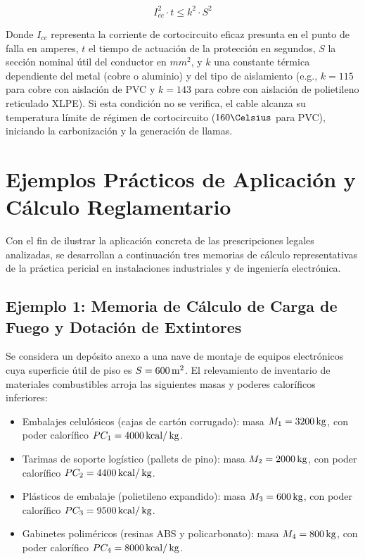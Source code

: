 \begin{equation}
\label{eq.cap4:tiempo_corte}
I_{cc}^2 \cdot t \le k^2 \cdot S^2
\end{equation}

Donde $I_{cc}$ representa la corriente de cortocircuito eficaz presunta en el punto de falla en amperes, $t$ el tiempo
de actuación de la protección en segundos, $S$ la sección nominal útil del conductor en $mm^2$, y $k$ una constante
térmica dependiente del metal (cobre o aluminio) y del tipo de aislamiento (e.g., $k = 115$ para cobre con aislación de
PVC y $k = 143$ para cobre con aislación de polietileno reticulado XLPE). Si esta condición no se verifica, el cable
alcanza su temperatura límite de régimen de cortocircuito ($160\Celsius$ para PVC), iniciando la carbonización y la
generación de llamas.

\section{Ejemplos Prácticos de Aplicación y Cálculo Reglamentario}
\label{sec.cap4:ejemplos_practicos}

Con el fin de ilustrar la aplicación concreta de las prescripciones legales analizadas, se desarrollan a continuación
tres memorias de cálculo representativas de la práctica pericial en instalaciones industriales y de ingeniería
electrónica.

\subsection{Ejemplo 1: Memoria de Cálculo de Carga de Fuego y Dotación de Extintores}
\label{sec.cap4:ejemplo_carga_fuego}

Se considera un depósito anexo a una nave de montaje de equipos electrónicos cuya superficie útil de piso es $S = 600\,\mathrm{m}^2$.
El relevamiento de inventario de materiales combustibles arroja las siguientes masas y poderes caloríficos inferiores:

\begin{itemize}
    \item Embalajes celulósicos (cajas de cartón corrugado): masa $M_1 = 3200\,\mathrm{kg}$, con poder calorífico
          $PC_1 = 4000\,\mathrm{kcal}/\,\mathrm{kg}$.
    \item Tarimas de soporte logístico (pallets de pino): masa $M_2 = 2000\,\mathrm{kg}$, con poder calorífico
          $PC_2 = 4400\,\mathrm{kcal}/\,\mathrm{kg}$.
    \item Plásticos de embalaje (polietileno expandido): masa $M_3 = 600\,\mathrm{kg}$, con poder calorífico
          $PC_3 = 9500\,\mathrm{kcal}/\,\mathrm{kg}$.
    \item Gabinetes poliméricos (resinas ABS y policarbonato): masa $M_4 = 800\,\mathrm{kg}$, con poder calorífico
          $PC_4 = 8000\,\mathrm{kcal}/\,\mathrm{kg}$.
\end{itemize}

